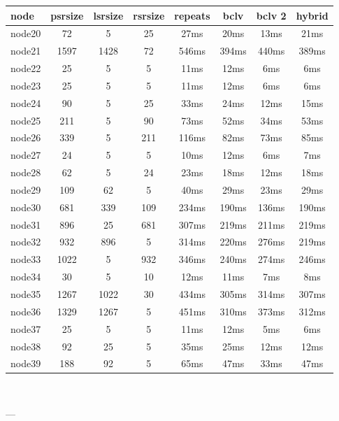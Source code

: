 \begin{tabular}{|l|c|c|c|c|c|c|c|}
\hline node & psrsize & lsrsize & rsrsize   & repeats & bclv & bclv 2 & hybrid\\
    \hline node20 & 72 & 5 & 25 & 27ms & 20ms & 13ms & 21ms\\
    \hline node21 & 1597 & 1428 & 72 & 546ms & 394ms & 440ms & 389ms\\
    \hline node22 & 25 & 5 & 5 & 11ms & 12ms & 6ms & 6ms\\
    \hline node23 & 25 & 5 & 5 & 11ms & 12ms & 6ms & 6ms\\
    \hline node24 & 90 & 5 & 25 & 33ms & 24ms & 12ms & 15ms\\
    \hline node25 & 211 & 5 & 90 & 73ms & 52ms & 34ms & 53ms\\
    \hline node26 & 339 & 5 & 211 & 116ms & 82ms & 73ms & 85ms\\
    \hline node27 & 24 & 5 & 5 & 10ms & 12ms & 6ms & 7ms\\
    \hline node28 & 62 & 5 & 24 & 23ms & 18ms & 12ms & 18ms\\
    \hline node29 & 109 & 62 & 5 & 40ms & 29ms & 23ms & 29ms\\
    \hline node30 & 681 & 339 & 109 & 234ms & 190ms & 136ms & 190ms\\
    \hline node31 & 896 & 25 & 681 & 307ms & 219ms & 211ms & 219ms\\
    \hline node32 & 932 & 896 & 5 & 314ms & 220ms & 276ms & 219ms\\
    \hline node33 & 1022 & 5 & 932 & 346ms & 240ms & 274ms & 246ms\\
    \hline node34 & 30 & 5 & 10 & 12ms & 11ms & 7ms & 8ms\\
    \hline node35 & 1267 & 1022 & 30 & 434ms & 305ms & 314ms & 307ms\\
    \hline node36 & 1329 & 1267 & 5 & 451ms & 310ms & 373ms & 312ms\\
    \hline node37 & 25 & 5 & 5 & 11ms & 12ms & 5ms & 6ms\\
    \hline node38 & 92 & 25 & 5 & 35ms & 25ms & 12ms & 12ms\\
    \hline node39 & 188 & 92 & 5 & 65ms & 47ms & 33ms & 47ms\\

\hline
\end{tabular} \

---


